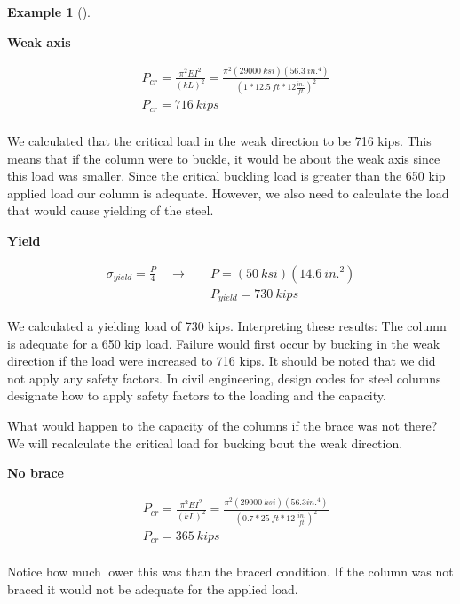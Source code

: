 \documentclass[
  letterpaper,
  DIV=11,
  numbers=noendperiod]{scrreprt}
\theoremstyle{definition}
\newtheorem{example}{Example}[chapter]
\theoremstyle{remark}
\begin{document}
\begin{tcolorbox}
\begin{example}[]
\begin{tcolorbox}
\textbf{Weak axis}

\[
\begin{aligned}
& P_{cr}=\frac{\pi^2 E I^2}{(k L)^2}=\frac{\pi^2(29000{~ksi})(56.3{~in.^4})}{\left(1*12.5{~ft}*12\frac{in.}{ft}\right)^2} \\
& P_{c r}=716{~kips} \\
\end{aligned}
\]

We calculated that the critical load in the weak direction to be 716
kips. This means that if the column were to buckle, it would be about
the weak axis since this load was smaller. Since the critical buckling
load is greater than the 650 kip applied load our column is adequate.
However, we also need to calculate the load that would cause yielding of
the steel.

\textbf{Yield}

\[
\begin{aligned}
\sigma_{yield}=\frac{P}{4} \quad\rightarrow\quad &P=(50{~ksi})(14.6{~in.^2}) \\
& P_{yield}=730{~kips}
\end{aligned}
\]

We calculated a yielding load of 730 kips. Interpreting these results:
The column is adequate for a 650 kip load. Failure would first occur by
bucking in the weak direction if the load were increased to 716 kips. It
should be noted that we did not apply any safety factors. In civil
engineering, design codes for steel columns designate how to apply
safety factors to the loading and the capacity.

What would happen to the capacity of the columns if the brace was not
there? We will recalculate the critical load for bucking bout the weak
direction.

\textbf{No brace}

\[
\begin{aligned}
& P_{cr}=\frac{\pi^2 E I^2}{(k L)^2}=\frac{\pi^2(29000{~ksi})(56.3{in.^4})}{\left(0.7*25{~ft}*12~\frac{in.}{ft}\right)^2} \\
& P_{c r}=365{~kips} \\
\end{aligned}
\]

Notice how much lower this was than the braced condition. If the column
was not braced it would not be adequate for the applied load.

\end{tcolorbox}

\end{example}

\end{tcolorbox}
\end{document}
